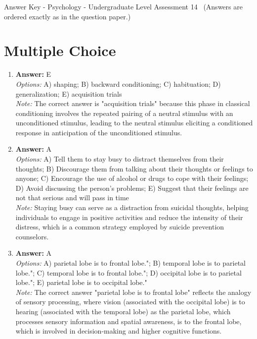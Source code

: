 \documentclass[12pt]{article}
\begin{document}
\begin{center}
Answer Key - Psychology - Undergraduate Level Assessment 14 \
\small (Answers are ordered exactly as in the question paper.)
\end{center}

\section*{Multiple Choice}
\begin{enumerate}[label=\arabic*.]
\item \textbf{Answer:} E
\\ \textit{Options:} A) shaping; B) backward conditioning; C) habituation; D) generalization; E) acquisition trials
\\ \textit{Note:} The correct answer is "acquisition trials" because this phase in classical conditioning involves the repeated pairing of a neutral stimulus with an unconditioned stimulus, leading to the neutral stimulus eliciting a conditioned response in anticipation of the unconditioned stimulus.
\item \textbf{Answer:} A
\\ \textit{Options:} A) Tell them to stay busy to distract themselves from their thoughts; B) Discourage them from talking about their thoughts or feelings to anyone; C) Encourage the use of alcohol or drugs to cope with their feelings; D) Avoid discussing the person's problems; E) Suggest that their feelings are not that serious and will pass in time
\\ \textit{Note:} Staying busy can serve as a distraction from suicidal thoughts, helping individuals to engage in positive activities and reduce the intensity of their distress, which is a common strategy employed by suicide prevention counselors.
\item \textbf{Answer:} A
\\ \textit{Options:} A) parietal lobe is to frontal lobe."; B) temporal lobe is to parietal lobe."; C) temporal lobe is to frontal lobe."; D) occipital lobe is to parietal lobe."; E) parietal lobe is to occipital lobe."
\\ \textit{Note:} The correct answer "parietal lobe is to frontal lobe" reflects the analogy of sensory processing, where vision (associated with the occipital lobe) is to hearing (associated with the temporal lobe) as the parietal lobe, which processes sensory information and spatial awareness, is to the frontal lobe, which is involved in decision-making and higher cognitive functions.

\end{enumerate}
\end{document}
